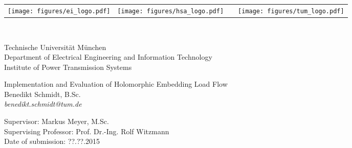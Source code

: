 \begin{titlepage}
	
	\begin{flushleft}
		\begin{tabularx}{\linewidth}{@{}llXr@{}}
			\texttt{[image: figures/ei\_logo.pdf]} &	
			\texttt{[image: figures/hsa\_logo.pdf]} & 
			& 
			\texttt{[image: figures/tum\_logo.pdf]}
		\end{tabularx}
	\end{flushleft}
	\hfill \\[1cm]
	
	\begin{flushleft}
		Technische Universität München \\
		Department of Electrical Engineering and Information Technology \\
		Institute of Power Transmission Systems \\[4cm]
	\end{flushleft}
		
	\begin{center}
		\huge
		Implementation and Evaluation of Holomorphic Embedding Load Flow \\[1cm]
		\large
		Benedikt Schmidt, B.Sc. \\
		\textit{benedikt.schmidt@tum.de} \\[7cm]
	\end{center}
	
	\begin{flushleft}
		Supervisor: Markus Meyer, M.Sc. \\
		Supervising Professor: Prof. Dr.-Ing. Rolf Witzmann \\
		Date of submission: ??.??.2015
	\end{flushleft}
\end{titlepage}
